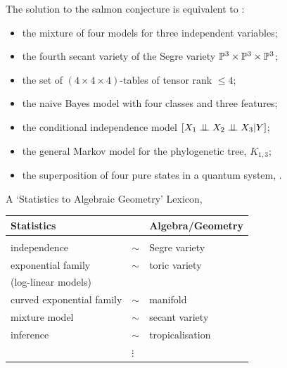 \begin{frame}

The solution to the salmon conjecture is equivalent to \cite{BS2009}:
    \begin{itemize}
        \item the mixture of four models for three independent variables;
        \item the fourth secant variety of the Segre variety $\mathbb{P}^{3} \times \mathbb{P}^{3} \times \mathbb{P}^{3}$;
        \item the set of $(4 \times 4 \times 4)$-tables of tensor rank $\leq 4$;
        \item the naive Bayes model with four classes and three features;
        \item the conditional independence model $[ X_{1} \perp \!\!\! \perp X_{2} \perp \!\!\! \perp X_{3} | Y ]$;
        \item the general Markov model for the phylogenetic tree, $K_{1,3}$;
        \item the superposition of four pure states in a quantum system, \cite{DBLH2001, HH2006}.
    \end{itemize}

\end{frame}

\begin{frame}

    \begin{block}{A `Statistics to Algebraic Geometry' Lexicon, \cite{BSLP2005}}

    \begin{table}[]
    \begin{tabular}{lll}
    Statistics                &   & Algebra/Geometry \\ \hline
                              &   &                  \\ 
    independence              & $\sim$ & Segre variety    \\ 
    exponential family        & $\sim$ & toric variety    \\ 
    (log-linear models)       &   &                  \\ 
    curved exponential family & $\sim$ & manifold         \\ 
    mixture model             & $\sim$ & secant variety   \\
    inference                 & $\sim$ & tropicalisation  \\
                              & $\vdots$ &           
    \end{tabular}
    \end{table}

    \end{block}

\end{frame}

